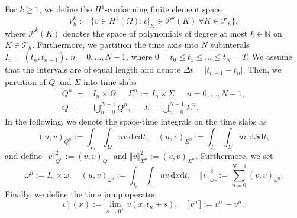 \documentclass[sn-mathphys-num]{sn-jnl}
\numberwithin{equation}{section}
\newcommand{\jump}[1]{\llbracket#1\rrbracket}
\newcommand{\dT}{\mathrm{d}t}
\newcommand{\dX}{\mathrm{d}x}
\newcommand{\dS}{\mathrm{d}S}
\begin{document}
\noindent For $k \ge 1$, we define the $H^1$-conforming finite element space 
\begin{equation}
    V_h^k := \{ v \in H^1(\Omega) : v \vert_{K} \in \mathcal{P}^k(K) \ \forall K \in \mathcal{T}_h \},
\end{equation}
where $\mathcal{P}^k(K)$ denotes the space of polynomials of degree at most $k \in \mathbb{N}$ on $K \in \mathcal{T}_h$. Furthermore, we partition the time axis into $N$ subinterals $I_n = (t_n,t_{n+1})$, $n = 0, \dots, N-1$, where $0 = t_0 \le t_1 \le \dots \le t_N = T$. We assume that the intervals are of equal length and denote $\Delta t = \vert t_{n+1} -t_n \vert$. Then, we partition of $Q$ and $\Sigma$ into time-slabs 
\begin{equation}
    \begin{aligned}
        Q^n := &I_n \times \Omega, \quad \Sigma^n := I_n \times \Sigma, \quad n = 0, \dots, N-1, \\
        Q = &\bigcup_{n = 0}^{N-1} Q^n, \quad \phantom{:} \Sigma = \bigcup_{n = 0}^{N-1} \Sigma^n.
    \end{aligned}
\end{equation}
In the following, we denote the space-time integrals on the time slabs as 
\begin{equation*}
    (u,v)_{Q^n} := \int_{I_n} \int_{\Omega} uv \ \dX \dT, \quad (u,v)_{\Sigma^n} := \int_{I_n} \int_{\Sigma} uv \ \dS \dT,
\end{equation*}
and define $\Vert v \Vert^2_{Q^n} := (v,v)_{Q^n}$ and $\Vert v \Vert^2_{\Sigma^n} := (v,v)_{\Sigma^n}$. 
Furthermore, we set 
\begin{equation*}
    \omega^n := I_n \times \omega, \quad (u,v)_{\omega^n} := \int_{I_n} \int_{\omega} uv \ \dX \dT, \quad \Vert v \Vert^2_{\omega_T} := \sum_{n = 0}^{N-1} (v,v)_{\omega^n}.
\end{equation*}
Finally, we define the time jump operator 
\begin{equation*}
    v^n_{\pm} (x) := \lim_{s \rightarrow 0^+} v(x,t_n \pm s), \quad \jump{v^n} := v^n_+ - v^n_-. 
\end{equation*}
\end{document}
